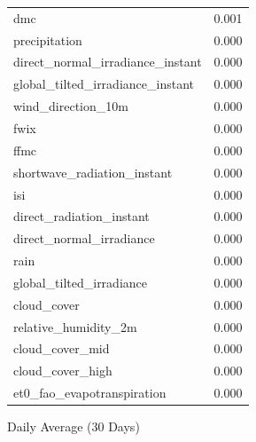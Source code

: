 \begin{table}[H]
\begin{tabular}{lc}
		dmc                                        & 0.001       \\ 
		precipitation                          & 0.000       \\ 
		direct\_normal\_irradiance\_instant     & 0.000       \\ 
		global\_tilted\_irradiance\_instant      & 0.000       \\ 
		wind\_direction\_10m                   & 0.000       \\ 
		fwix                                       & 0.000       \\ 
		ffmc                                       & 0.000       \\ 
		shortwave\_radiation\_instant           & 0.000       \\ 
		isi                                        & 0.000       \\ 
		direct\_radiation\_instant             & 0.000       \\ 
		direct\_normal\_irradiance            & 0.000       \\ 
		rain                                  & 0.000       \\ 
		global\_tilted\_irradiance             & 0.000       \\ 
		cloud\_cover                          & 0.000       \\ 
		relative\_humidity\_2m                & 0.000       \\ 
		cloud\_cover\_mid                      & 0.000       \\ 
		cloud\_cover\_high                     & 0.000       \\ 
		et0\_fao\_evapotranspiration         & 0.000       \\ 
	\end{tabular}
\end{table}

Daily Average (30 Days)

